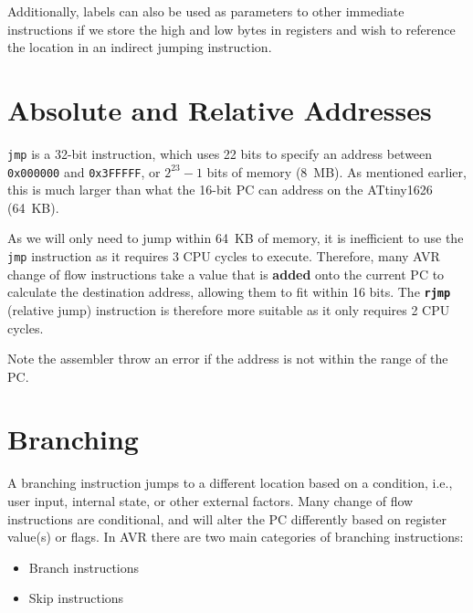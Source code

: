 \documentclass{report}
\newcommand{\keywordinline}[1]{\textcolor[rgb]{0.00,0.50,0.00}{\textbf{\texttt{#1}}}}
\begin{document}
Additionally, labels can also be used as parameters to other immediate instructions if we store the high and low
bytes in registers and wish to reference the location in an indirect jumping instruction.
\section{Absolute and Relative Addresses}
\texttt{jmp} is a 32-bit instruction, which uses 22 bits to specify an address between \texttt{0x000000} %
and \texttt{0x3FFFFF}, or \(2^{23} - 1\) bits of memory (\qty{8}{MB}). As mentioned earlier, this is much larger %
than what the 16-bit PC can address on the ATtiny1626 (\qty{64}{KB}).

As we will only need to jump within \qty{64}{KB} of memory, it is inefficient to use the \texttt{jmp} instruction as it
requires 3 CPU cycles to execute. Therefore, many AVR change of flow instructions take a value that is
\textbf{added} onto the current PC to calculate the destination address, allowing them to fit within 16 bits.
The \keywordinline{rjmp} (relative jump) instruction is therefore more suitable as it only requires 2
CPU cycles.

Note the assembler throw an error if the address is not within the range of the PC\@.
\section{Branching}
A branching instruction jumps to a different location based on a condition, i.e., user input, internal state, or other external factors.
Many change of flow instructions are conditional, and will alter the PC differently based on register value(s) or flags.
In AVR there are two main categories of branching instructions:
\begin{itemize}
    \item Branch instructions
    \item Skip instructions
\end{itemize}
\end{document}
